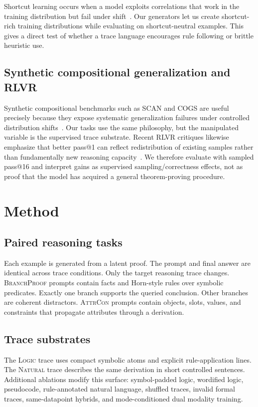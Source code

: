 \documentclass[11pt]{article}
\makeatletter
\newcommand{\branchproof}{\textsc{BranchProof}}
\newcommand{\attrcon}{\textsc{AttrCon}}
\newcommand{\logic}{\textsc{Logic}}
\newcommand{\nl}{\textsc{Natural}}
\newcommand{\passsixteen}{pass@16}
\makeatother
\begin{document}
Shortcut learning occurs when a model exploits correlations that work in the
training distribution but fail under shift~\citep{geirhos2020shortcut}. Our
generators let us create shortcut-rich training distributions while evaluating
on shortcut-neutral examples. This gives a direct test of whether a trace
language encourages rule following or brittle heuristic use.

\subsection{Synthetic compositional generalization and RLVR}

Synthetic compositional benchmarks such as SCAN and COGS are useful precisely
because they expose systematic generalization failures under controlled
distribution shifts~\citep{lake2018generalization,keysers2020measuring}. Our
tasks use the same philosophy, but the manipulated variable is the supervised
trace substrate. Recent RLVR critiques likewise emphasize that better pass@1
can reflect redistribution of existing samples rather than fundamentally new
reasoning capacity~\citep{yue2025does}. We therefore evaluate with sampled
\passsixteen{} and interpret gains as supervised sampling/correctness effects,
not as proof that the model has acquired a general theorem-proving procedure.

\section{Method}
\label{sec:method}

\subsection{Paired reasoning tasks}

Each example is generated from a latent proof. The prompt and final answer are
identical across trace conditions. Only the target reasoning trace changes.
\branchproof{} prompts contain facts and Horn-style rules over symbolic
predicates. Exactly one branch supports the queried conclusion. Other branches
are coherent distractors. \attrcon{} prompts contain objects, slots, values, and
constraints that propagate attributes through a derivation.

\subsection{Trace substrates}

The \logic{} trace uses compact symbolic atoms and explicit rule-application
lines. The \nl{} trace describes the same derivation in short controlled
sentences. Additional ablations modify this surface: symbol-padded logic,
wordified logic, pseudocode, rule-annotated natural language, shuffled traces,
invalid formal traces, same-datapoint hybrids, and mode-conditioned
dual modality training.
\end{document}
